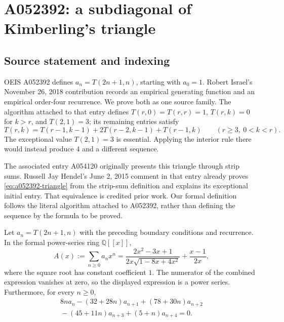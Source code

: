 \section{A052392: a subdiagonal of Kimberling's triangle}
\label{sec:a052392}

\subsection{Source statement and indexing}

OEIS A052392 defines $a_n=T(2n+1,n)$, starting with $a_0=1$.
Robert Israel's November 26, 2018 contribution records an empirical
generating function and an empirical order-four recurrence. We prove both
as one source family. The algorithm attached to that entry defines
$T(r,0)=T(r,r)=1$, $T(r,k)=0$ for $k>r$, and $T(2,1)=3$; its remaining
entries satisfy
\begin{equation}\label{eq:a052392-triangle}
 T(r,k)=T(r-1,k-1)+2T(r-2,k-1)+T(r-1,k)
 \qquad(r\ge3,\ 0<k<r).
\end{equation}
The exceptional value $T(2,1)=3$ is essential. Applying the interior rule
there would instead produce $4$ and a different sequence.

The associated entry A054120 originally presents this triangle through
strip sums. Russell Jay Hendel's June 2, 2015 comment in that entry already
proves \eqref{eq:a052392-triangle} from the strip-sum definition and
explains its exceptional initial entry. That equivalence is credited
prior work. Our formal definition follows the literal algorithm attached
to A052392, rather than defining the sequence by the formula to be proved.

\begin{theorem}\label{thm:a052392-main}
Let $a_n=T(2n+1,n)$ with the preceding boundary conditions and recurrence.
In the formal power-series ring $\mathbb Q[[x]]$,
\begin{equation}\label{eq:a052392-gf}
 A(x):=\sum_{n\ge0}a_nx^n
 =\frac{2x^2-3x+1}{2x\sqrt{1-8x+4x^2}}+\frac{x-1}{2x},
\end{equation}
where the square root has constant coefficient $1$. The numerator of
the combined expression vanishes at zero, so the displayed expression
is a power series. Furthermore, for every $n\ge0$,
\begin{equation}\label{eq:a052392-rec}
\begin{split}
 8na_n-(32+28n)a_{n+1}+(78+30n)a_{n+2}\\
 {}-(45+11n)a_{n+3}+(5+n)a_{n+4}=0.
\end{split}
\end{equation}
\end{theorem}

